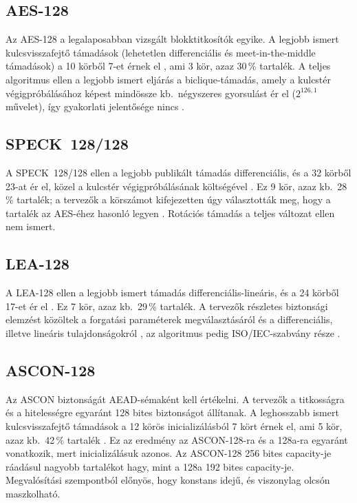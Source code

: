 \documentclass[a4paper,12pt]{report}
\theoremstyle{definition}
\theoremstyle{remark}
\begin{document}
\subsection{AES-128}

Az AES-128 a legalaposabban vizsgált blokktitkosítók egyike. A legjobb ismert kulcsvisszafejtő támadások (lehetetlen differenciális és meet-in-the-middle támadások) a 10 körből 7-et érnek el \cite{Derbez2013}, ami 3 kör, azaz 30\,\% tartalék. A teljes algoritmus ellen a legjobb ismert eljárás a biclique-támadás, amely a kulcstér végigpróbálásához képest mindössze kb.\ négyszeres gyorsulást ér el ($2^{126{,}1}$ művelet), így gyakorlati jelentősége nincs \cite{Bogdanov2011}.

\subsection{SPECK~128/128}

A SPECK~128/128 ellen a legjobb publikált támadás differenciális, és a 32 körből 23-at ér el, közel a kulcstér végigpróbálásának költségével \cite{Song2016}. Ez 9 kör, azaz kb.\ 28\,\% tartalék; a tervezők a körszámot kifejezetten úgy választották meg, hogy a tartalék az AES-éhez hasonló legyen \cite{Beaulieu2017}. Rotációs támadás a teljes változat ellen nem ismert.

\subsection{LEA-128}

A LEA-128 ellen a legjobb ismert támadás differenciális-lineáris, és a 24 körből 17-et ér el \cite{Chen2023}. Ez 7 kör, azaz kb.\ 29\,\% tartalék. A tervezők részletes biztonsági elemzést közöltek a forgatási paraméterek megválasztásáról és a differenciális, illetve lineáris tulajdonságokról \cite{Hong2013}, az algoritmus pedig ISO/IEC-szabvány része \cite{ISO29192}.

\subsection{ASCON-128}

Az ASCON biztonságát AEAD-sémaként kell értékelni. A tervezők a titkosságra és a hitelességre egyaránt 128 bites biztonságot állítanak. A leghosszabb ismert kulcsvisszafejtő támadások a 12 körös inicializálásból 7 kört érnek el, ami 5 kör, azaz kb.\ 42\,\% tartalék \cite{Dobraunig2021}. Ez az eredmény az ASCON-128-ra és a 128a-ra egyaránt vonatkozik, mert inicializálásuk azonos. Az ASCON-128 256 bites capacity-je ráadásul nagyobb tartalékot hagy, mint a 128a 192 bites capacity-je. Megvalósítási szempontból előnyös, hogy konstans idejű, és viszonylag olcsón maszkolható.
\end{document}
